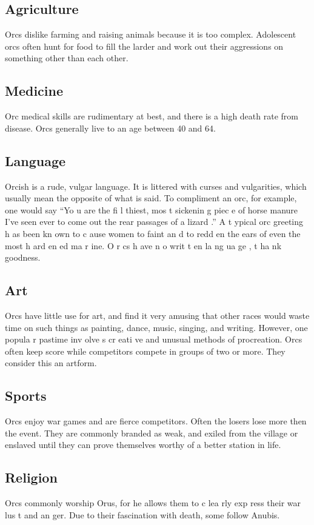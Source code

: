\begin{multicols*}{2}
\subsection{Agriculture}
Orcs dislike farming and raising animals because it
is too complex. Adolescent orcs often hunt for food to fill the
larder and work out their aggressions on something other than
each other.
\subsection{Medicine}
Orc medical skills are rudimentary at best, and there
is a high death rate from disease. Orcs generally live to an age
between 40 and 64.
\subsection{Language}
Orcish is a rude, vulgar language. It is littered with
curses and vulgarities, which usually mean the opposite of
what is said. To compliment an orc, for example, one would
say “Yo u are the fi l thiest, mos t sickenin g piec e of horse
manure I’ve seen ever to come out the rear passages of a
lizard .” A t ypical orc greeting h as been kn own to c ause
women to faint an d to redd en the ears of even the most
h ard en ed ma r ine. O r cs h ave n o writ t en la ng ua ge , t ha nk
goodness.
\subsection{Art}
Orcs have little use for art, and find it very amusing
that other races would waste time on such things as painting,
dance, music, singing, and writing.
However, one popula r pastime inv olve s cr eati ve
and unusual methods of procreation. Orcs often keep score
while competitors compete in groups of two or more. They
consider this an artform.
\subsection{Sports}
Orcs enjoy war games and are fierce competitors.
Often the losers lose more then the event. They are commonly
branded as weak, and exiled from the village or enslaved until
they can prove themselves worthy of a better station in life.
\subsection{Religion}
Orcs commonly worship Orus, for he allows them
to c lea rly exp ress their war lus t and an ger. Due to their
fascination with death, some follow Anubis.

\end{multicols*}
